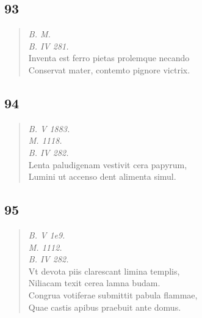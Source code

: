 \documentclass[11pt, a4paper]{report}
\begin{document}
            \subsection*{93}
      \begin{verse}
      \textit{B. M.} \\ \textit{B. IV 281.} \\ Inventa est ferro pietas prolemque necando \\ Conservat mater, contemto pignore victrix. \\ 
      \end{verse}
  
            \subsection*{94}
      \begin{verse}
      \textit{B. V 1883.} \\ \textit{M. 1118.} \\ \textit{B. IV 282.} \\ Lenta paludigenam vestivit cera papyrum, \\ Lumini ut accenso dent alimenta simul. \\ 
      \end{verse}
  
            \subsection*{95}
      \begin{verse}
      \textit{B. V 1e9.} \\ \textit{M. 1112.} \\ \textit{B. IV 282.} \\ Vt devota piis clarescant limina templis, \\ Niliacam texit cerea lamna budam. \\ Congrua votiferae submittit pabula flammae, \\ Quae castis apibus praebuit ante domus. \\ 
      \end{verse}
  
\end{document}
